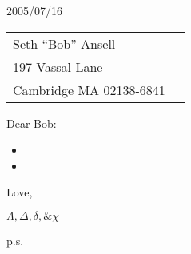 \documentclass[10pt]{article}%
\def\docdate{2005/07/16}%
\begin{document}
\thispagestyle{first}

\docdate
\medskip

\begin{tabular*}{\columnwidth}{@{\extracolsep{\fill}}lr}%
  Seth ``Bob'' Ansell &\\
  197 Vassal Lane \\
  Cambridge MA 02138-6841
\end{tabular*}
\medskip

Dear Bob:

\begin{multicols}{2}

\lipsum[2-5]

\begin{itemize}
\item \lipsum[6]
\item \lipsum[7]
\end{itemize}

\lipsum[8-9]

\end{multicols}



Love,

{\large $\Lambda, \Delta, \delta, \& \chi$}

\vspace{3ex}

\begin{minipage}[c]{0.1\linewidth}p.s.\end{minipage}
\begin{minipage}[c]{0.9\linewidth}
\lipsum[10]%
\end{minipage}
\end{document}
